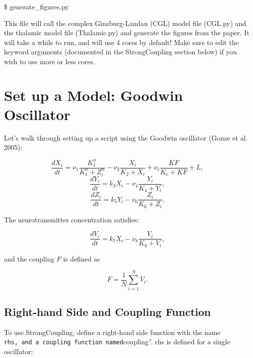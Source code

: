 \documentclass[english,a4paper,oneside]{article}
\begin{document}
\$ generate\_figures.py

This file will call the complex Ginzburg-Landau (CGL) model file
(CGL.py) and the thalamic model file (Thalamic.py) and generate the
figures from the paper. It will take a while to run, and will use 4
cores by default! Make sure to edit the keyword arguments (documented in
the StrongCoupling section below) if you wish to use more or less cores.

\hypertarget{set-up-a-model-goodwin-oscillator}{%
\section{Set up a Model: Goodwin
Oscillator}\label{set-up-a-model-goodwin-oscillator}}

Let's walk through setting up a script using the Goodwin oscillator
(Gonze et al. 2005):

\[\frac{dX_i}{dt} = \nu_1 \frac{K_1^n}{K_1^n+Z_i^n} - \nu_2 \frac{X_i}{K_2 + X_i}+ \nu_c \frac{KF}{K_c + KF} + L,\]
\[\frac{dY_i}{dt} = k_3 X_i - \nu_4 \frac{Y_i}{K_4 + Y_i},\]
\[\frac{dZ_i}{dt} = k_5 Y_i - \nu_6 \frac{Z_i}{K_6 + Z_i}.\]

The neurotransmitter concentration satisfies:

\[\frac{dV_i}{dt} = k_7 X_i - \nu_8 \frac{V_i}{K_8 + V_i},\]

and the coupling \(F\) is defined as

\[F = \frac{1}{N}\sum_{i=1}^N V_i.\]

\hypertarget{right-hand-side-and-coupling-function}{%
\subsection{Right-hand Side and Coupling
Function}\label{right-hand-side-and-coupling-function}}

To use StrongCoupling, define a right-hand side function with the name
\texttt{rhs\textquotesingle{}\textquotesingle{},\ and\ a\ coupling\ function\ named}coupling''.
rhs is defined for a single oscillator:
\end{document}

